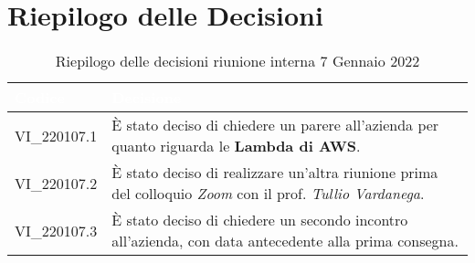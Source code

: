 \section{Riepilogo delle Decisioni}


\begin{table}[!htbp]
\renewcommand{\arraystretch}{1.5}
\begin{tabular}{m{}<{\centering}  m{}<{\centering}}
\rowcolor{darkblue} \textcolor{white}{\textbf{Codice}} & \textcolor{white}{\textbf{Decisione}} \\
\hline
VI\_220107.1 & È stato deciso di chiedere un parere all'azienda per quanto riguarda le \textbf{Lambda di AWS}.\\
\rowcolor{gray!10} VI\_220107.2 &  È stato deciso di realizzare un'altra riunione prima del colloquio \textit{Zoom} con il prof. \textit{Tullio Vardanega}.\\
VI\_220107.3 & È stato deciso di chiedere un secondo incontro all'azienda, con data antecedente alla prima consegna.\\
\end{tabular}
\caption{Riepilogo delle decisioni riunione interna 7 Gennaio 2022}
\end{table}
